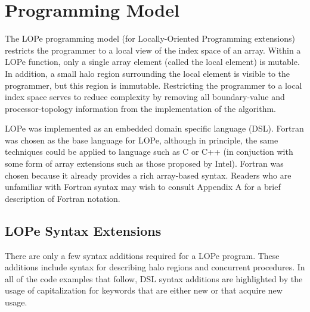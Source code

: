 \section{Programming Model}

The LOPe programming model (for Locally-Oriented Programming extensions) restricts the programmer to
a local view of the index space of an array.  Within a LOPe function, only a single array element (called
the local element) is mutable.  In addition, a small halo region surrounding the local element is
visible to the programmer, but this region is immutable.  Restricting the programmer to a local
index space serves to reduce complexity by removing all boundary-value and processor-topology
information from the implementation of the algorithm.


LOPe was implemented as an embedded domain specific language (DSL).  Fortran was chosen as the base
language for LOPe, although in principle, the same techniques could be applied to language such as C
or C++ (in conjuction with some form of array extensions such as those proposed by Intel).  Fortran
was chosen because it already provides a rich array-based syntax.  Readers who are unfamiliar with
Fortran syntax may wish to consult Appendix A for a brief description of Fortran notation.

\subsection{LOPe Syntax Extensions}

There are only a few syntax additions required for a LOPe program.  These additions include syntax for
describing halo regions and concurrent procedures.  In all of the code examples that follow, DSL
syntax additions are highlighted by the usage of capitalization for keywords that are either new or
that acquire new usage.


